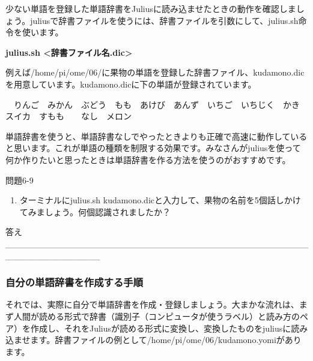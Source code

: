 \documentclass[a4paper,dvipdfmx]{jarticle}
\newcommand\liststyleLxii{%
\renewcommand\theenumi{\arabic{enumi}}
\renewcommand\theenumii{\arabic{enumii}}
\renewcommand\theenumiii{\arabic{enumiii}}
\renewcommand\theenumiv{\arabic{enumiv}}
\renewcommand\labelenumi{\theenumi.}
\renewcommand\labelenumii{\theenumii.}
\renewcommand\labelenumiii{\theenumiii.}
\renewcommand\labelenumiv{\theenumiv.}
}
\begin{document}
{
少ない単語を登録した単語辞書をJuliusに読み込ませたときの動作を確認しましょう。juliusで辞書ファイルを使うには、辞書ファイルを引数にして、julius.sh命令を使います。}

{\ttfamily\bfseries
julius.sh {\textless}辞書ファイル名.dic{\textgreater}}

{
例えば/home/pi/ome/06/に果物の単語を登録した辞書ファイル、kudamono.dicを用意しています。kudamono.dicに下の単語が登録されています。}

{
\ \ りんご　みかん　ぶどう　もも　あけび　あんず　いちご　いちじく　かき　スイカ　すもも　\ \ なし　メロン}

{
単語辞書を使うと、単語辞書なしでやったときよりも正確で高速に動作していると思います。これが単語の種類を制限する効果です。みなさんがjuliusを使って何か作りたいと思ったときは単語辞書を作る方法を使うのがおすすめです。}

{
問題6-9}

\liststyleLxii
\begin{enumerate}
\item {
ターミナルにjulius.sh
kudamono.dicと入力して、果物の名前を5個話しかけてみましょう。何個認識されましたか？\newline
}
\end{enumerate}
{\raggedleft{}
答え\_\_\_\_\_\_\_\_\_\_\_\_\_\_\_\_\_\_\_\_\_\_\_\_\_\_\_\_\_\_\_\_\_\_\_\_\_\_\_\_\_\_\_\_\_\_\_\_\_\_\_\_\_\_\_\_\_\_\_\_\_\_\_
\par}

\subsubsection{自分の単語辞書を作成する手順}
{
それでは、実際に自分で単語辞書を作成・登録しましょう。大まかな流れは、まず人間が読める形式で辞書（識別子（コンピュータが使うラベル）と読み方のペア）を作成し、それをJuliusが読める形式に変換し、変換したものをjuliusに読み込ませます。辞書ファイルの例として/home/pi/ome/06/kudamono.yomiがあります。}
\end{document}
